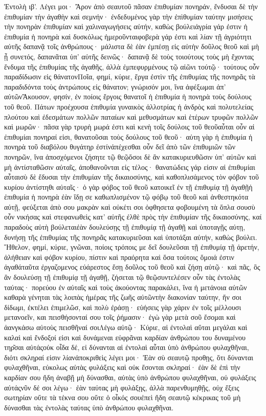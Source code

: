 Ἐντολὴ ιβ’.
Λέγει μοι· Ἄρον ἀπὸ σεαυτοῦ πᾶσαν ἐπιθυμίαν πονηράν, ἔνδυσαι δὲ τὴν ἐπιθυμίαν τὴν ἀγαθὴν καὶ σεμνήν· ἐνδεδυμένος γὰρ τὴν ἐπὶθυμίαν ταύτην μισήσεις τὴν πονηρὰν ἐπιθυμίαν καὶ χαλιναγωγήσεις αὐτήν, καθὼς βούλειἀγρία γάρ ἐστιν ἡ ἐπιθυμία ἡ πονηρὰ καὶ δυσκόλως ἡμεροῦνταιφοβερὰ γάρ ἐστι καὶ λίαν τῇ ἀγριότητι αὐτῆς δαπανᾷ τοῖς ἀνθρώπους· μάλιστα δὲ ἐὰν ἐμπέσῃ εἰς αὐτὴν δοῦλος θεοῦ καὶ μὴ ᾖ συνετός, δαπανᾶται ὑπ’ αὐτῆς δεινῶς· δαπανᾷ δὲ τοὺς τοιούτους τοὺς μὴ ἔχοντας ἔνδυμα τῆς ἐπιθυμίας τῆς ἀγαθῆς, ἀλλὰ ἐμπεφυρμένους τῷ αἰῶνι τούτῷ· τούτους οὖν παραδίδωσιν εἰς θάνατονΠοῖα, φημί, κύριε, ἔργα ἐστὶν τῆς ἐπιθυμίας τῆς πονηρᾶς τὰ παραδιδόντα τοὺς ἀντρώπους εἰς θάνατον; γνώρισόν μοι, ἵνα ἀφέξωμαι ἀπ’ αὐτῶνἌκουσον, φησίν, ἐν ποίοις ἔργοις θανατοῖ ἡ ἐπιθυμία ἡ πονηρὰ τοὺς δούλους τοῦ θεοῦ.
Πάτων προέχουσα ἐπιθυμία γυναικὸς ἀλλοτρίας ἡ ἀνδρὸς καὶ πολυτελείας πλούτου καὶ ἐδεσμάτων πολλῶν παταίων καὶ μεθυσμάτων καὶ ἑτέρων τρυφῶν πολλῶν καὶ μωρῶν· πᾶσα γὰρ τρυρὴ μωρά ἐστι καὶ κενὴ τοῖς δούλοις τοῦ θεοῦαὗται οὖν αἱ ἐπιθυμίαι πονηραί εἰσι, θανατοῦσαι τοὺς δούλους τοῦ θεοῦ· αὑτη γὰρ ἡ ἐπιθυμία ἡ πονηρὰ τοῦ διαβόλου θυγάτηρ ἐστίνἀπέχεσθαι οὖν δεῖ ἀπὸ τῶν ἐπιθυμιῶν τῶν πονηρῶν, ἵνα ἀποσχόμενοι ζήσητε τῷ θεῷὅσοι δὲ ἂν κατακυριευθῶσιν ὑπ’ αὐτῶν καὶ μὴ ἀντίσταθῶσιν αὐταῖς, ἀποθανοῦνται εἰς τέλος· θανατώδεις γάρ εἰσιν αἱ ἐπιθυμίαι αὗταισὺ δὲ ἔδυσαι τὴν ἐπιθυμίαν τῆς δικαιοσύνης, καὶ καθοπλισάμενος τὸν φόβον τοῦ κυρίου ἀντίστηθι αὐταῖς· ὁ γὰρ φόβος τοῦ θεοῦ κατοικεῖ ἐν τῇ ἐπιθυμίᾳ τῇ ἀγαθῇἡ ἐπιθυμία ἡ πονηρὰ ἐὰν ἴδῃ σε καθωπλισμένον τῷ φόβῳ τοῦ θεοῦ καὶ ἀνθεστηκότα αὐτῇ, φεύξεται ἀπὸ σου μακρὰν καὶ οὐκέτι σοι ὀφθησετα φοβουμένη τὰ ὅπλα σουσὺ οὖν νικήσας καὶ στεφανωθεὶς κατ’ αὐτῆς ἐλθὲ πρὸς τὴν ἐπιθυμίαν τῆς δικαιοσύνης, καί παραδοὺς αὐτὴ βούλεταιἐὰν δουλεύσῃς τῇ ἐπιθυμίᾳ τῇ ἀγαθῇ καὶ ὑποταγῇς αὐτῃ, δυνήσῃ τῆς ἐπιθυμίας τῆς πονηρᾶς κατακυριεῦσαι καὶ ὑποτάξαι αὐτήν, καθὼς βούλει.
Ἤθελον, φημί, κύριε, γνῶναι, ποίοις τρόποις με δεῖ δουλεῦσαι τῇ ἐπιθυμίᾳ τῇ ἀρετήν, ἀλήθειαν καὶ φόβον κυρίου, πίστιν καὶ πραόρητα καὶ ὅσα τούτοις ὅμοιά ἐστιν ἀγαθάταῦτα ἐργαζομενος εὐάρεστος ἔσῃ δοῦλος τοῦ θεοῦ καὶ ζήσῃ αὐτῷ· καὶ πᾶς, ὃς ἂν δουλεύσῃ τῇ ἐπιθυμίᾳ τῇ ἀγαθῇ, ζήσεται τῷ θεῷσυντελέσεν οὖν τὰς ἐντολὰς ταύτας· πορεύου ἐν αὐταῖς καὶ τοὺς ἀκούοντας παρακάλει, ἵνα ἡ μετάνοια αὐτῶν καθαρὰ γένηται τὰς λοιπὰς ἡμέρας τῆς ζωῆς αὐτῶντὴν διακονίαν ταύτην, ἥν σοι δίδωμι, ἐκτέλει ἐπιμελῶσ, καὶ πολὺ ἐράσῃ· εὑήσεις γὰρ χάριν ἐν τοῖς μέλλουσι μετανοεῖν, και πεισθήσονταί σου τοῖς ῥήμασιν· ἐγὼ γὰρ μετὰ σοῦ ἔσομαι καὶ ἀανγκάσω αὐτοὺς πεισθῆναί σοιΛέγω αὐτῷ· Κύριε, αἱ ἐντολαὶ αὕται μεγάλαι καὶ καλαὶ καὶ ἔνδοξοί εἰσι καὶ δυνάμεναι εὐφρᾶναι καρδίαν ἀνθρώπου του δυναμένου τηρ͂σαι αὐτάςοὐκ οἶδα δέ, εἰ δύνανται αἱ ἐντολαὶ αὗται ὑπὸ ἀνθρώπου φυλαχθῆναι, διότι σκληραί εἰσιν λίανἀποκριθεὶς λέγει μοι· Ἐὰν σὺ σεαυτῷ προθῃς, ὅτι δύνανται φυλαχθῆναι, εὐκολως αὐτὰς φυλάξεις καὶ οὐκ ἔσονται σκληραί· ἐὰν δὲ ἐπὶ τὴν καρδίαν σου ἤδη ἀναβῇ μὴ δύνασθαι, αὐτὰς ὑπὸ ἀνθρώπου φυλαχθῆναι, οὐ φυλάξεις αὐτάςνῦν δέ σοι λέγω· ἐὰν ταύτας μὴ φυλάξῃς, ἀλλὰ παρενθυμηθῇς, οὐχ ἔξεις σωτηρίαν οὔτε τὰ τέκνα σου οὔτε ὁ οἶκός σουἐπεὶ ἤδη σεαυτῷ κέκρικας τοῦ μὴ δύνασθαι τὰς ἐντολὰς ταύτας ὑπὸ ἀνθρώπου φυλαχθῆναι.
